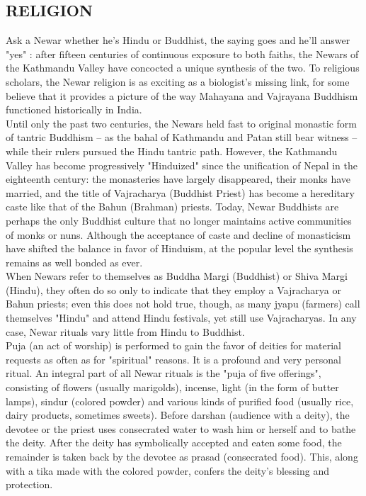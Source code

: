 \documentclass[a4paper,13pt, margin=0.9in]{article}
\begin{document}
\begin{flushleft}
	\newpage

	\subsection{RELIGION}
	Ask a Newar whether he's Hindu or Buddhist, the saying goes and he'll answer "yes" : after fifteen centuries of continuous exposure to both faiths, the Newars of the Kathmandu Valley have concocted a unique synthesis of the two. To religious scholars, the Newar religion is as exciting as a biologist's missing link, for some believe that it provides a picture of the way Mahayana and Vajrayana Buddhism functioned historically in India.\\

	Until only the past two centuries, the Newars held fast to original monastic form of tantric Buddhism – as the bahal of Kathmandu and Patan still bear witness – while their rulers pursued the Hindu tantric path. However, the Kathmandu Valley has become progressively "Hinduized" since the unification of Nepal in the eighteenth century: the monasteries have largely disappeared, their monks have married, and the title of Vajracharya (Buddhist Priest) has become a hereditary caste like that of the Bahun (Brahman) priests. Today, Newar Buddhists are perhaps the only Buddhist culture that no longer maintains active communities of monks or nuns. Although the acceptance of caste and decline of monasticism have shifted the balance in favor of Hinduism, at the popular level the synthesis remains as well bonded as ever.\\

	When Newars refer to themselves as Buddha Margi (Buddhist) or Shiva Margi (Hindu), they often do so only to indicate that they employ a Vajracharya or Bahun priests; even this does not hold true, though, as many jyapu (farmers) call themselves "Hindu" and attend Hindu festivals, yet still use Vajracharyas. In any case, Newar rituals vary little from Hindu to Buddhist.\\

	Puja (an act of worship) is performed to gain the favor of deities for material requests as often as for "spiritual" reasons. It is a profound and very personal ritual. An integral part of all Newar rituals is the "puja of five offerings", consisting of flowers (usually marigolds), incense, light (in the form of butter lamps), sindur (colored powder) and various kinds of purified food (usually rice, dairy products, sometimes sweets). Before darshan (audience with a deity), the devotee or the priest uses consecrated water to wash him or herself and to bathe the deity. After the deity has symbolically accepted and eaten some food, the remainder is taken back by the devotee as prasad (consecrated food). This, along with a tika made with the colored powder, confers the deity's blessing and protection.\\


\end{flushleft}
\end{document}
